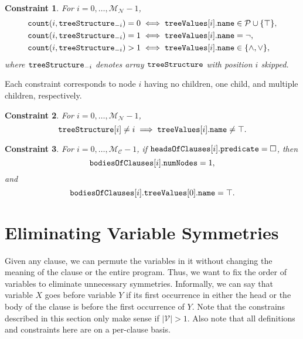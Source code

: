 \documentclass[runningheads]{llncs}
\newtheorem{constraint}{Constraint}
\newcommand{\variable}[1]{\texttt{\textup{#1}}}
\newcommand{\predicates}{\mathcal{P}}
\newcommand{\variables}{\mathcal{V}}
\newcommand{\maxNumNodes}{\mathcal{M}_{\mathcal{N}}}
\newcommand{\maxNumClauses}{\mathcal{M}_{\mathcal{C}}}
\begin{document}
\begin{constraint}
  For $i = 0, \dots, \maxNumNodes{} - 1$,
  \begin{align*}
    \variable{count}(i, \variable{treeStructure}_{-i}) = 0 &\iff \variable{treeValues}[i].\variable{name} \in \predicates{} \cup \{ \top \},\\
    \variable{count}(i, \variable{treeStructure}_{-i}) = 1 &\iff \variable{treeValues}[i].\variable{name} = \neg,\\
    \variable{count}(i, \variable{treeStructure}_{-i}) > 1 &\iff \variable{treeValues}[i].\variable{name} \in \{ \land, \lor \},
  \end{align*}
  where $\variable{treeStructure}_{-i}$ denotes array $\variable{treeStructure}$
  with position $i$ skipped.
\end{constraint}
Each constraint corresponds to node $i$ having no children, one child, and
multiple children, respectively.


\begin{constraint}
  For $i = 0, \dots, \maxNumNodes{} - 1$,
  \[
    \variable{treeStructure}[i] \ne i \implies
    \variable{treeValues}[i].\variable{name} \ne \top.
  \]
\end{constraint}

\begin{constraint}
  For $i = 0, \dots, \maxNumClauses{} - 1$, if
  $\variable{headsOfClauses}[i].\variable{predicate} = \Box$, then
  \[
    \variable{bodiesOfClauses}[i].\variable{numNodes} = 1,
  \]
  and
  \[
    \variable{bodiesOfClauses}[i].\variable{treeValues}[0].\variable{name} =
    \top.
  \]
\end{constraint}

\section{Eliminating Variable Symmetries} \label{sec:variable_symmetry}

Given any clause, we can permute the variables in it without changing the
meaning of the clause or the entire program. Thus, we want to fix the order of
variables to eliminate unnecessary symmetries. Informally, we can say that
variable $X$ goes before variable $Y$ if its first occurrence in either the head
or the body of the clause is before the first occurrence of $Y$. Note that the
constrains described in this section only make sense if $|\variables| > 1$. Also
note that all definitions and constraints here are on a per-clause basis.
\end{document}
